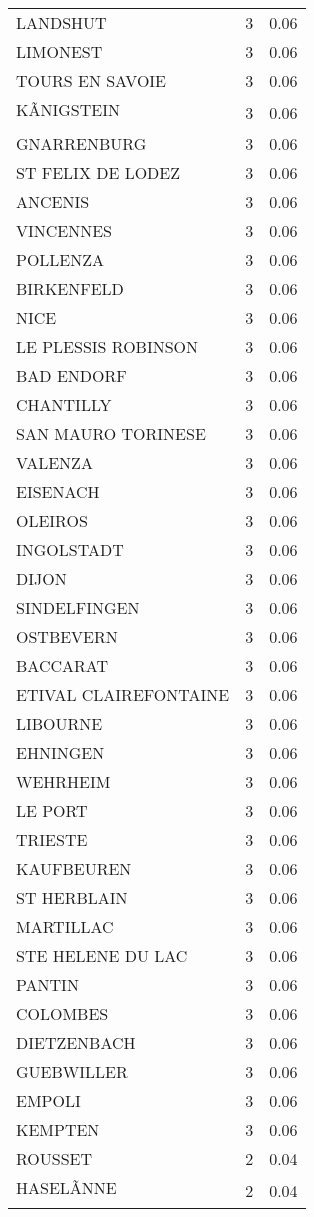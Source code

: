\begin{table*}[htbp]
\begin{tabular}{lrr}
LANDSHUT & 3 & 0.06 \\
LIMONEST & 3 & 0.06 \\
TOURS EN SAVOIE & 3 & 0.06 \\
KÃNIGSTEIN & 3 & 0.06 \\
GNARRENBURG & 3 & 0.06 \\
ST FELIX DE LODEZ & 3 & 0.06 \\
ANCENIS & 3 & 0.06 \\
VINCENNES & 3 & 0.06 \\
POLLENZA & 3 & 0.06 \\
BIRKENFELD & 3 & 0.06 \\
NICE & 3 & 0.06 \\
LE PLESSIS ROBINSON & 3 & 0.06 \\
BAD ENDORF & 3 & 0.06 \\
CHANTILLY & 3 & 0.06 \\
SAN MAURO TORINESE & 3 & 0.06 \\
VALENZA & 3 & 0.06 \\
EISENACH & 3 & 0.06 \\
OLEIROS & 3 & 0.06 \\
INGOLSTADT & 3 & 0.06 \\
DIJON & 3 & 0.06 \\
SINDELFINGEN & 3 & 0.06 \\
OSTBEVERN & 3 & 0.06 \\
BACCARAT & 3 & 0.06 \\
ETIVAL CLAIREFONTAINE & 3 & 0.06 \\
LIBOURNE & 3 & 0.06 \\
EHNINGEN & 3 & 0.06 \\
WEHRHEIM & 3 & 0.06 \\
LE PORT & 3 & 0.06 \\
TRIESTE & 3 & 0.06 \\
KAUFBEUREN & 3 & 0.06 \\
ST HERBLAIN & 3 & 0.06 \\
MARTILLAC & 3 & 0.06 \\
STE HELENE DU LAC & 3 & 0.06 \\
PANTIN & 3 & 0.06 \\
COLOMBES & 3 & 0.06 \\
DIETZENBACH & 3 & 0.06 \\
GUEBWILLER & 3 & 0.06 \\
EMPOLI & 3 & 0.06 \\
KEMPTEN & 3 & 0.06 \\
ROUSSET & 2 & 0.04 \\
HASELÃNNE & 2 & 0.04 \\

\end{tabular}
\end{table*}
